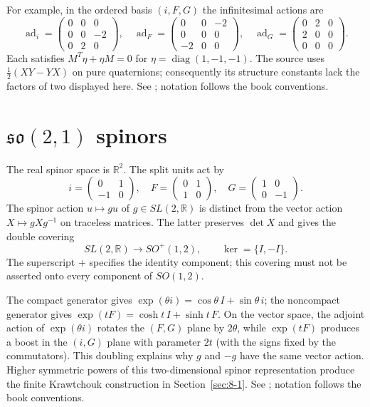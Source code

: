 For example, in the ordered basis $(i,F,G)$ the infinitesimal actions are
\[
\operatorname{ad}_i=\begin{pmatrix}0&0&0\\0&0&-2\\0&2&0\end{pmatrix},\quad
\operatorname{ad}_F=\begin{pmatrix}0&0&-2\\0&0&0\\-2&0&0\end{pmatrix},\quad
\operatorname{ad}_G=\begin{pmatrix}0&2&0\\2&0&0\\0&0&0\end{pmatrix}.
\]
Each satisfies $M^T\eta+\eta M=0$ for $\eta=\operatorname{diag}(1,-1,-1)$.
The source uses $\tfrac12(XY-YX)$ on pure quaternions; consequently its
structure constants lack the factors of two displayed here.
See \cite[Section~7]{KocikFeynman}; notation follows the book conventions.

\section{$\mathfrak{so}(2,1)$ spinors}
\label{sec:6-2}
The real spinor space is $\mathbb R^2$. The split units act by
\[
i=\begin{pmatrix}0&1\\-1&0\end{pmatrix},\quad
F=\begin{pmatrix}0&1\\1&0\end{pmatrix},\quad
G=\begin{pmatrix}1&0\\0&-1\end{pmatrix}.
\]
The spinor action $u\mapsto gu$ of $g\in SL(2,\mathbb R)$ is distinct
from the vector action $X\mapsto gXg^{-1}$ on traceless matrices.
The latter preserves $\det X$ and gives the double covering
\[
SL(2,\mathbb R)\longrightarrow SO^+(1,2),\qquad
\ker=\{I,-I\}.
\]
The superscript $+$ specifies the identity component; this covering
must not be asserted onto every component of $SO(1,2)$.

The compact generator gives
$\exp(\theta i)=\cos\theta\,I+\sin\theta\,i$; the noncompact generator gives
$\exp(tF)=\cosh t\,I+\sinh t\,F$.
On the vector space, the adjoint action of $\exp(\theta i)$ rotates the
$(F,G)$ plane by $2\theta$, while $\exp(tF)$ produces a boost in the
$(i,G)$ plane with parameter $2t$ (with the signs fixed by the commutators).
This doubling explains why $g$ and $-g$ have the same vector action.
Higher symmetric powers of this two-dimensional spinor representation
produce the finite Krawtchouk construction in Section~\ref{sec:8-1}.
See \cite[Section~7]{KocikFeynman}; notation follows the book conventions.

